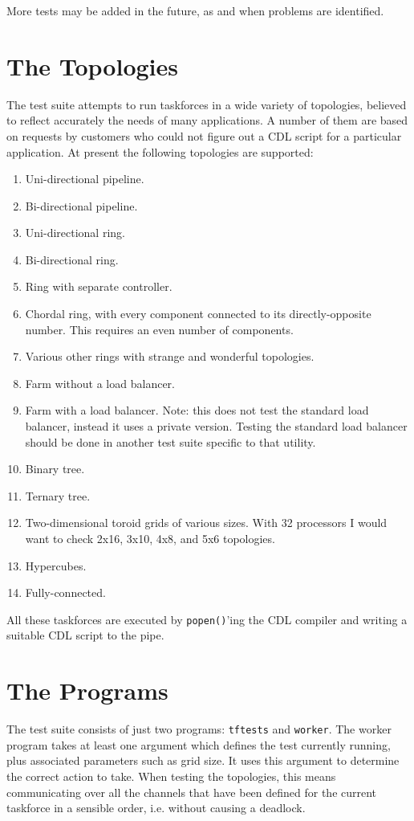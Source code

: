 More tests may be added in the future, as and when problems are identified.

\section{The Topologies}

The test suite attempts to run taskforces in a wide variety of topologies,
believed to reflect accurately the needs of many applications. A number of
them are based on requests by customers who could not figure out a CDL
script for a particular application. At present
the following topologies are supported:

\begin{enumerate}
\item Uni-directional pipeline.
\item Bi-directional pipeline.
\item Uni-directional ring.
\item Bi-directional ring.
\item Ring with separate controller.
\item Chordal ring, with every component connected to its directly-opposite
number. This requires an even number of components.
\item Various other rings with strange and wonderful topologies.
\item Farm without a load balancer.
\item Farm with a load balancer. Note: this does not test the standard
load balancer, instead it uses a private version. Testing the standard
load balancer should be done in another test suite specific to that
utility.
\item Binary tree. 
\item Ternary tree.
\item Two-dimensional toroid grids of various sizes.
With 32 processors I would want to check 2x16, 3x10, 4x8, and 5x6 topologies. 
\item Hypercubes.
\item Fully-connected.
\end{enumerate}

All these taskforces are executed by {\tt popen()}'ing the CDL compiler
and writing a suitable CDL script to the pipe.

\section{The Programs}

The test suite consists of just two programs: {\tt tftests} and
{\tt worker}. The worker program takes at least one argument which defines
the test currently running, plus associated parameters such as grid size.
It uses this argument to determine the correct action to take.
When testing the topologies, this means communicating over all the
channels that have been defined for the current taskforce in a sensible
order, i.e. without causing a deadlock.



